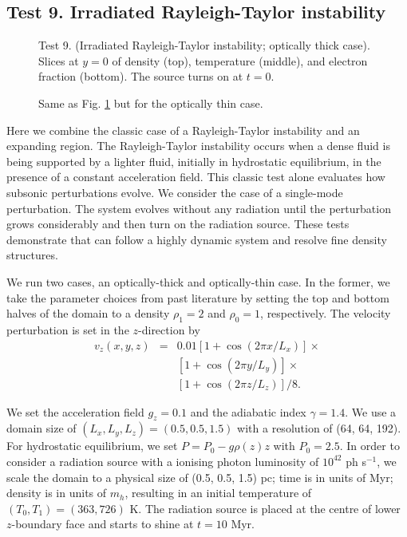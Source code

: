 \documentclass[useAMS,usenatbib]{mn2e}
\begin{document}
\subsection{Test 9. Irradiated Rayleigh-Taylor instability}

\begin{figure}
  \caption{\label{fig:test9_thick} Test 9. (Irradiated Rayleigh-Taylor
    instability; optically thick case).  Slices at $y=0$ of density
    (top), temperature (middle), and electron fraction (bottom).  The
    source turns on at $t=0$.}
\end{figure}

\begin{figure}
  \caption{\label{fig:test9_thin} Same as Fig. \ref{fig:test9_thick}
    but for the optically thin case.}
\end{figure}

Here we combine the classic case of a Rayleigh-Taylor instability and
an expanding \hii region.  The Rayleigh-Taylor instability
occurs when a dense fluid is being supported by a lighter fluid,
initially in hydrostatic equilibrium, in the presence of a constant
acceleration field.  This classic test alone evaluates how subsonic
perturbations evolve.  We consider the case of a single-mode
perturbation.  The system evolves without any radiation until the
perturbation grows considerably and then turn on the radiation source.
These tests demonstrate that \moray can follow a highly dynamic
system and resolve fine density structures.

We run two cases, an optically-thick and optically-thin case.  In
the former, we take the parameter choices from past literature
\citep[e.g.][]{Liska03, Stone08} by setting the top and bottom halves
of the domain to a density $\rho_1 = 2$ and $\rho_0 = 1$,
respectively.  The velocity perturbation is set in the $z$-direction
by
\begin{eqnarray}
  v_z(x,y,z) & = & 0.01 [1 + \cos(2\pi x / L_x)] \times  \nonumber\\
  & & [1 + \cos(2\pi y / L_y)] \times \nonumber\\
  & & [1 + \cos(2\pi z / L_z)]/8.
\end{eqnarray}

We set the acceleration field $g_z = 0.1$ and the adiabatic index
$\gamma = 1.4$.  We use a domain size of $(L_x, L_y, L_z) = (0.5, 0.5,
1.5)$ with a resolution of (64, 64, 192).  For hydrostatic
equilibrium, we set $P = P_0 - g \rho(z) z$ with $P_0 = 2.5$.  In
order to consider a radiation source with a ionising photon luminosity
of $10^{42}$ ph s$^{-1}$, we scale the domain to a physical size of
(0.5, 0.5, 1.5) pc; time is in units of Myr; density is in units of
$m_h$, resulting in an initial temperature of $(T_0, T_1) = (363,
726)$ K.  The radiation source is placed at the centre of lower
$z$-boundary face and starts to shine at $t = 10$ Myr.
\end{document}
